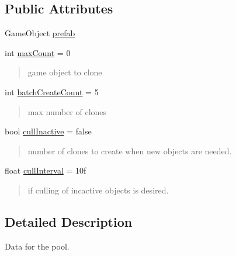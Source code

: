 \subsection*{Public Attributes}
\begin{DoxyCompactItemize}
\item 
Game\-Object \hyperlink{class_hostile_1_1_simple_pool_1_1_simple_pool_1_1_pool_data_a07ccce81192461026b94dc8f9aa8d818}{prefab}
\item 
int \hyperlink{class_hostile_1_1_simple_pool_1_1_simple_pool_1_1_pool_data_a184e81d595ad9455d412f67162c7b1c9}{max\-Count} = 0
\begin{DoxyCompactList}\small\item\em \begin{quotation}
game object to clone \end{quotation}
\end{DoxyCompactList}\item 
int \hyperlink{class_hostile_1_1_simple_pool_1_1_simple_pool_1_1_pool_data_aa54efc2b91d459428c230443d6ccac7b}{batch\-Create\-Count} = 5
\begin{DoxyCompactList}\small\item\em \begin{quotation}
max number of clones \end{quotation}
\end{DoxyCompactList}\item 
bool \hyperlink{class_hostile_1_1_simple_pool_1_1_simple_pool_1_1_pool_data_a060629295fb510de44ccd4e7ab0a41f1}{cull\-Inactive} = false
\begin{DoxyCompactList}\small\item\em \begin{quotation}
number of clones to create when new objects are needed. \end{quotation}
\end{DoxyCompactList}\item 
float \hyperlink{class_hostile_1_1_simple_pool_1_1_simple_pool_1_1_pool_data_a174300eacbde77efbf917eff6e209def}{cull\-Interval} = 10f
\begin{DoxyCompactList}\small\item\em \begin{quotation}
if culling of incactive objects is desired. \end{quotation}
\end{DoxyCompactList}\end{DoxyCompactItemize}


\subsection{Detailed Description}
Data for the pool. 


